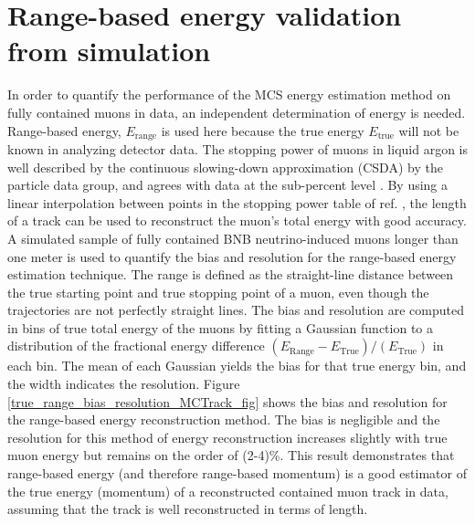 \documentclass[a4paper,11pt]{article}
\begin{document}
\section{Range-based energy validation from simulation}\label{Range_Energy_Validation_section}
In order to quantify the performance of the MCS energy estimation method on fully contained muons in data, an independent determination of energy is needed. Range-based energy, $E_{\text{range}}$ is used here because the true energy $E_{\text{true}}$ will not be known in analyzing detector data. The stopping power of muons in liquid argon is well described by the continuous slowing-down approximation (CSDA) by the particle data group, and agrees with data at the sub-percent level \cite{MIPenergysource} \cite{PDG_spline_table} \cite{NISTdata}. By using a linear interpolation between points in the stopping power table of ref. \cite{PDG_spline_table}, the length of a track can be used to reconstruct the muon's total energy with good accuracy. A simulated sample of fully contained BNB neutrino-induced muons longer than one meter is used to quantify the bias and resolution for the range-based energy estimation technique. The range is defined as the straight-line distance between the true starting point and true stopping point of a muon, even though the trajectories are not perfectly straight lines. The bias and resolution are computed in bins of true total energy of the muons by fitting a Gaussian function to a distribution of the fractional energy difference $(E_{\text{Range}}-E_{\text{True}})/(E_{\text{True}})$ in each bin. The mean of each Gaussian yields the bias for that true energy bin, and the width indicates the resolution. Figure \ref{true_range_bias_resolution_MCTrack_fig} shows the bias and resolution for the range-based energy reconstruction method. The bias is negligible and the resolution for this method of energy reconstruction increases slightly with true muon energy but remains on the order of (2-4)\%. This result demonstrates that range-based energy (and therefore range-based momentum) is a good estimator of the true energy (momentum) of a reconstructed contained muon track in data, assuming that the track is well reconstructed in terms of length.
\end{document}
